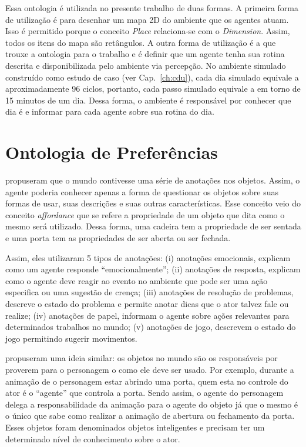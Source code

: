 Essa ontologia é utilizada no presente trabalho de duas formas. A primeira
forma de utilização é para desenhar um mapa 2D do ambiente que os agentes
atuam. Isso é permitido porque o conceito \emph{Place} relaciona-se com o
\emph{Dimension}. Assim, todos os itens do mapa são retângulos. A outra forma
de utilização é a que trouxe a ontologia para o trabalho e é definir que um
agente tenha sua rotina descrita e disponibilizada pelo ambiente via
percepção. No ambiente simulado construído como estudo de caso (ver
Cap.~\ref{ch:cdu}), cada dia simulado equivale a
aproximadamente 96 ciclos, portanto, cada passo simulado equivale a em torno
de 15 minutos de um dia. Dessa forma, o ambiente é responsável por conhecer
que dia é e informar para cada agente sobre sua rotina do dia.

\section{Ontologia de Preferências} \label{ch:aec:oda}

\citet{doyle1998annotated} propuseram que o mundo contivesse uma série de
anotações nos objetos. Assim, o agente poderia conhecer apenas a forma de
questionar os objetos sobre suas formas de usar, suas descrições e suas outras
características. Esse conceito veio do conceito \emph{affordance} que se
refere a propriedade de um objeto que dita como o mesmo será utilizado.
Dessa forma, uma cadeira tem a propriedade de ser sentada e uma porta tem as
propriedades de ser aberta ou ser fechada.

Assim, eles utilizaram 5 tipos de anotações: (i) anotações emocionais,
explicam como um agente responde ``emocionalmente''; (ii) anotações de
resposta, explicam como o agente deve reagir ao evento no ambiente que pode ser
uma ação especifica ou uma sugestão de crença; (iii) anotações de resolução de
problemas, descreve o estado do problema e permite anotar dicas que o ator
talvez fale ou realize; (iv) anotações de papel, informam o agente sobre ações
relevantes para determinados trabalhos no mundo; (v) anotações de jogo,
descrevem o estado do jogo permitindo sugerir movimentos.

\citet{kallmann1999modeling} propuseram uma ideia similar: os objetos no mundo
são os responsáveis por proverem para o personagem o como ele deve ser usado.
Por exemplo, durante a animação de o personagem estar abrindo uma porta, quem esta
no controle do ator é o ``agente'' que controla a porta. Sendo assim, o agente do
personagem delega a responsabilidade da animação para o agente do objeto já
que o mesmo é o único que sabe como realizar a animação de abertura ou
fechamento da porta. Esses objetos foram denominados objetos inteligentes e precisam
ter um determinado nível de conhecimento sobre o ator.

